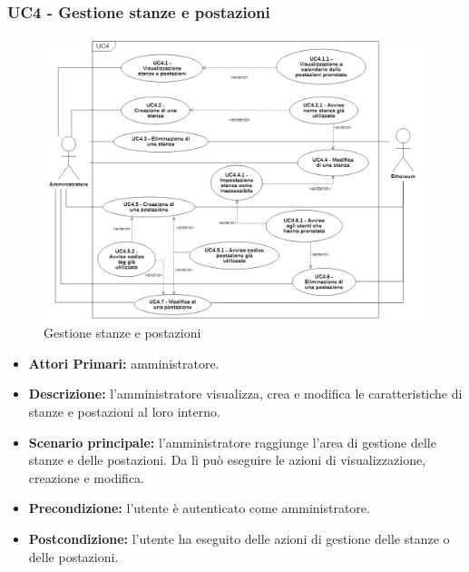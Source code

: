 \subsubsection{ UC4 - Gestione stanze e postazioni}
\begin{figure}[H]
	\centering
	\includegraphics[width=18cm]{res/images/UC4.png}
	\caption{Gestione stanze e postazioni}
	\label{fig:Gestione stanze e postazioni}
\end{figure}
\begin{itemize}
           	\item\textbf{Attori Primari:} 
           	amministratore.
           	\item\textbf{Descrizione:} 
           	l'amministratore visualizza, crea e modifica le caratteristiche di stanze e postazioni al loro interno.
           	\item\textbf{Scenario principale:} 
           	l'amministratore raggiunge l'area di gestione delle stanze e delle postazioni. Da lì può eseguire le azioni di visualizzazione, creazione e modifica.
           	\item\textbf{Precondizione:} 
           	l'utente è autenticato come amministratore.
           	\item\textbf{Postcondizione:}
           	l'utente ha eseguito delle azioni di gestione delle stanze o delle postazioni.
\end{itemize}

